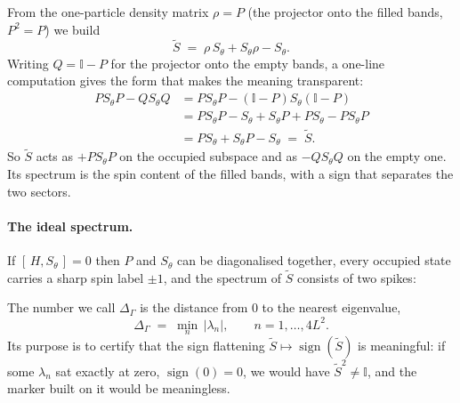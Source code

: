 \documentclass[11pt,a4paper]{article}
\newcommand{\Stilde}{\widetilde{S}}
\newcommand{\Sth}{S_\theta}
\begin{document}
From the one-particle density matrix $\rho = P$ (the projector onto the filled
bands, $P^2=P$) we build
\begin{equation}
  \Stilde \;=\; \rho\, \Sth + \Sth \rho - \Sth .
  \label{eq:Stilde}
\end{equation}
Writing $Q=\mathbb{I}-P$ for the projector onto the empty bands, a one-line
computation gives the form that makes the meaning transparent:
\begin{align}
  P\Sth P - Q\Sth Q
  &= P\Sth P - (\mathbb{I}-P)\Sth(\mathbb{I}-P) \nonumber\\
  &= P\Sth P - \Sth + \Sth P + P \Sth - P \Sth P \nonumber\\
  &= P\Sth + \Sth P - \Sth \;=\; \Stilde .
  \label{eq:PSPminusQSQ}
\end{align}
So $\Stilde$ acts as $+P\Sth P$ on the occupied subspace and as $-Q\Sth Q$ on
the empty one. Its spectrum is the spin content of the filled bands, with a
sign that separates the two sectors.

\paragraph{The ideal spectrum.} If $[\,H,\Sth\,]=0$ then $P$ and $\Sth$ can be
diagonalised together, every occupied state carries a sharp spin label
$\pm1$, and the spectrum of $\Stilde$ consists of two spikes:

\begin{center}
\end{center}

\noindent
The number we call $\Delta_\Gamma$ is the distance from $0$ to the nearest
eigenvalue,
\begin{equation}
  \Delta_\Gamma \;=\; \min_{n} \, |\lambda_n| ,
  \qquad n = 1,\dots,4L^2 .
  \label{eq:gapdef}
\end{equation}
Its purpose is to certify that the sign flattening
$\Stilde \mapsto \operatorname{sign}(\Stilde)$ is meaningful: if some
$\lambda_n$ sat exactly at zero, $\operatorname{sign}(0)=0$, we would have
$\Stilde^2\neq\mathbb{I}$, and the marker built on it would be meaningless.
\end{document}
